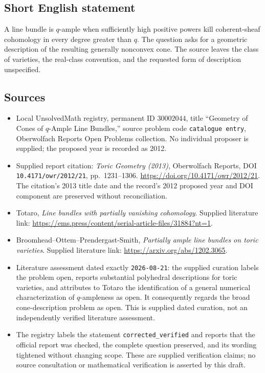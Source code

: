 \documentclass[11pt]{article}
\begin{document}
\subsection{Short English statement}
A line bundle is \(q\)-ample when sufficiently high positive powers kill coherent-sheaf cohomology in every degree greater than \(q\). The question asks for a geometric description of the resulting generally nonconvex cone. The source leaves the class of varieties, the real-class convention, and the requested form of description unspecified.
\subsection{Sources}
\begin{itemize}
\item Local UnsolvedMath registry, permanent ID \(30002044\), title ``Geometry of Cones of \(q\)-Ample Line Bundles,'' source problem code \texttt{catalogue entry}, Oberwolfach Reports Open Problems collection. No individual proposer is supplied; the proposed year is recorded as 2012.
\item Supplied report citation: \emph{Toric Geometry (2013)}, Oberwolfach Reports, DOI \texttt{10.4171/owr/2012/21}, pp.\ 1231--1306. \url{https://doi.org/10.4171/owr/2012/21}. The citation's 2013 title date and the record's 2012 proposed year and DOI component are preserved without reconciliation.
\item Totaro, \emph{Line bundles with partially vanishing cohomology}. Supplied literature link: \url{https://ems.press/content/serial-article-files/31884?nt=1}.
\item Broomhead--Ottem--Prendergast-Smith, \emph{Partially ample line bundles on toric varieties}. Supplied literature link: \url{https://arxiv.org/abs/1202.3065}.
\item Literature assessment dated exactly \texttt{2026-08-21}: the supplied curation labels the problem open, reports substantial polyhedral descriptions for toric varieties, and attributes to Totaro the identification of a general numerical characterization of \(q\)-ampleness as open. It consequently regards the broad cone-description problem as open. This is supplied dated curation, not an independently verified literature assessment.
\item The registry labels the statement \texttt{corrected\_verified} and reports that the official report was checked, the complete question preserved, and its wording tightened without changing scope. These are supplied verification claims; no source consultation or mathematical verification is asserted by this draft.
\end{itemize}
\end{document}
